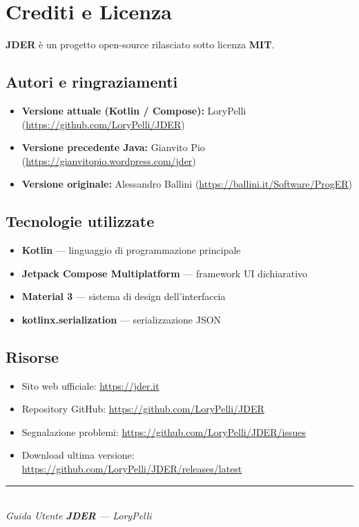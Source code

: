 \documentclass[a4paper,11pt]{article}
\newcommand{\jder}{\textbf{JDER}}
\newcommand{\theauthor}{LoryPelli}
\begin{document}
\section{Crediti e Licenza}
\label{sec:crediti}

\jder{} è un progetto open-source rilasciato sotto licenza \textbf{MIT}.

\subsection*{Autori e ringraziamenti}
\begin{itemize}
  \item \textbf{Versione attuale (Kotlin / Compose):} LoryPelli
        (\url{https://github.com/LoryPelli/JDER})
  \item \textbf{Versione precedente Java:} Gianvito Pio
        (\url{https://gianvitopio.wordpress.com/jder})
  \item \textbf{Versione originale:} Alessandro Ballini
        (\url{https://ballini.it/Software/ProgER})
\end{itemize}

\subsection*{Tecnologie utilizzate}
\begin{itemize}
  \item \textbf{Kotlin} --- linguaggio di programmazione principale
  \item \textbf{Jetpack Compose Multiplatform} --- framework UI dichiarativo
  \item \textbf{Material 3} --- sistema di design dell'interfaccia
  \item \textbf{kotlinx.serialization} --- serializzazione JSON
\end{itemize}

\subsection*{Risorse}
\begin{itemize}
  \item Sito web ufficiale: \url{https://jder.it}
  \item Repository GitHub: \url{https://github.com/LoryPelli/JDER}
  \item Segnalazione problemi: \url{https://github.com/LoryPelli/JDER/issues}
  \item Download ultima versione: \url{https://github.com/LoryPelli/JDER/releases/latest}
\end{itemize}

\vfill
\begin{center}
  \textcolor{jderorange}{\rule{8cm}{1pt}}\\[4pt]
  {\small \textit{Guida Utente \jder{} --- \theauthor}}
\end{center}
\end{document}
